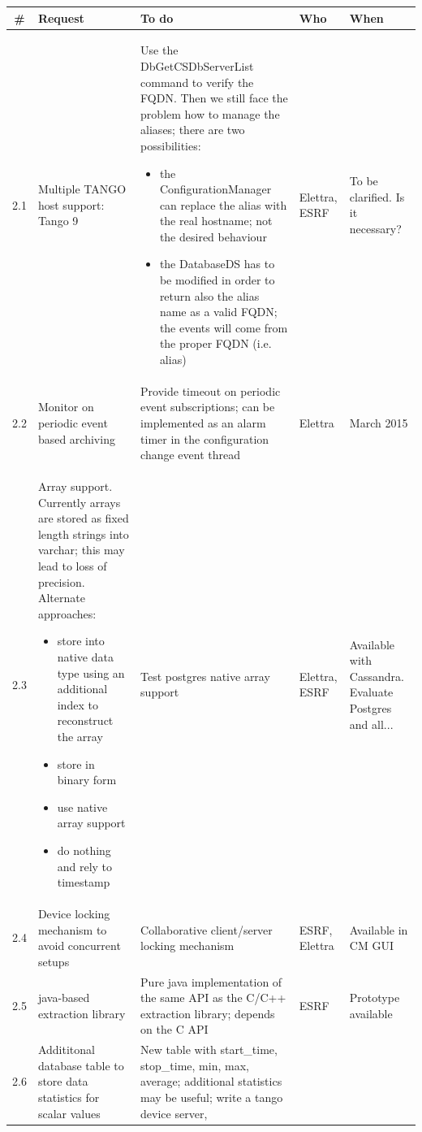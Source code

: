 \documentclass[11pt,a4paper]{article}
\begin{document}
\begin{longtable}{|c|p{6.0cm}|p{6.0cm}|p{1.0cm}|p{1.4cm}|}
	\hline
	\bf{\#} & \bf{Request} & \bf{To do} & \bf{Who} & \bf{When} \\
	\hline
	\endhead
	2.1 &
	Multiple TANGO host support: Tango 9 & 
	Use the DbGetCSDbServerList command to verify the FQDN.
	Then we still face the problem how to manage the aliases; there are
	two possibilities:
	\begin{itemize}
		\item the ConfigurationManager can replace the alias with the
					real hostname; not the desired behaviour
		\item the DatabaseDS has to be modified in order to return also
					the alias name as a valid FQDN; the events will come from
					the proper FQDN (i.e. alias)
	\end{itemize} &
	Elettra, ESRF &
	To be clarified. Is it necessary? \\
	\hline
	2.2 &
	Monitor on periodic event based archiving &
	Provide timeout on periodic event subscriptions; can be
	implemented as an alarm timer in the configuration change
	event thread &
	Elettra &
	March 2015 \\
	\hline
	2.3 &
	Array support. Currently arrays are stored as fixed length
	strings into varchar; this may lead to loss of precision.
	Alternate approaches:
	\begin{itemize}
		\item store into native data type using an additional index to
		    	reconstruct the array
		\item store in binary form
		\item use native array support
		\item do nothing and rely to timestamp
	\end{itemize} &
	Test postgres native array support &
	Elettra, ESRF &
	Available with Cassandra. Evaluate Postgres and all... \\
	\hline
	2.4 &
	Device locking mechanism to avoid concurrent setups &
	Collaborative client/server locking mechanism &
	ESRF, Elettra &
	Available in CM GUI \\
	\hline
	2.5 &
	java-based extraction library &
	Pure java implementation of the same API as the C/C++ extraction
	library; depends on the C API &
	ESRF &
	Prototype available \\
	\hline
	2.6 &
	Addititonal database table to store data statistics for scalar
	values &
	New table with start\_time, stop\_time, min, max, average;
	additional statistics may be useful; write a tango device server,

\end{longtable}
\end{document}
